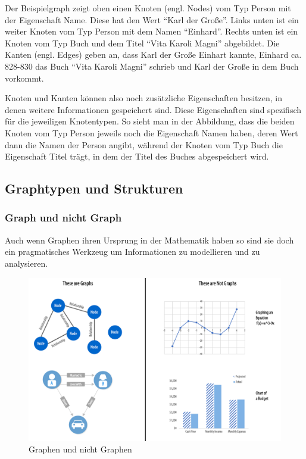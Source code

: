 \documentclass[12pt,ngerman,]{article}
\begin{document}
Der Beispielgraph zeigt oben einen Knoten (engl. Nodes) vom Typ Person
mit der Eigenschaft Name. Diese hat den Wert ``Karl der Große''. Links
unten ist ein weiter Knoten vom Typ Person mit dem Namen ``Einhard''.
Rechts unten ist ein Knoten vom Typ Buch und dem Titel ``Vita Karoli
Magni'' abgebildet. Die Kanten (engl. Edges) geben an, dass Karl der
Große Einhart kannte, Einhard ca. 828-830 das Buch ``Vita Karoli Magni''
schrieb und Karl der Große in dem Buch vorkommt.

Knoten und Kanten können also noch zusätzliche Eigenschaften besitzen,
in denen weitere Informationen gespeichert sind. Diese Eigenschaften
sind spezifisch für die jeweiligen Knotentypen. So sieht man in der
Abbildung, dass die beiden Knoten vom Typ Person jeweils noch die
Eigenschaft Namen haben, deren Wert dann die Namen der Person angibt,
während der Knoten vom Typ Buch die Eigenschaft Titel trägt, in dem der
Titel des Buches abgespeichert wird.

\subsection{Graphtypen und Strukturen}\label{graphtypen-und-strukturen}

\subsubsection{Graph und nicht Graph}\label{graph-und-nicht-graph}

Auch wenn Graphen ihren Ursprung in der Mathematik haben so sind sie
doch ein pragmatisches Werkzeug um Informationen zu modellieren und zu
analysieren.

\begin{figure}
\centering
\includegraphics{Bilder/GraphsNotGraphs.png}
\caption{Graphen und nicht Graphen}
\end{figure}
\end{document}
